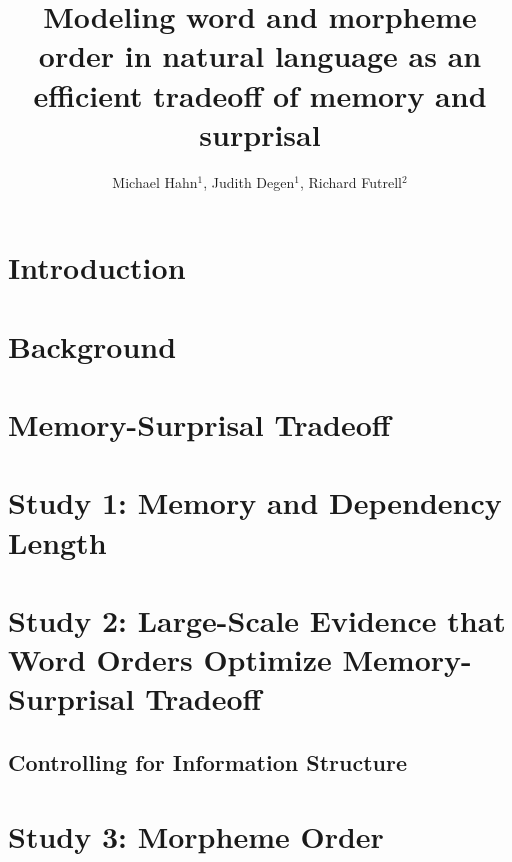 \documentclass[man]{apa7}
\title{Modeling word and morpheme order in natural language as an efficient tradeoff of memory and surprisal}
\author{Michael Hahn$^1$, Judith Degen$^1$, Richard Futrell$^2$}
\affiliation{$^1$ Stanford University, $^2$ University of California, Irvine}
\begin{document}
\maketitle


\section{Introduction}



\section{Background}\label{sec:background}





\section{Memory-Surprisal Tradeoff}\label{sec:ms-tradeoff}



\section{Study 1: Memory and Dependency Length}\label{sec:toy-study}





\section{Study 2: Large-Scale Evidence that Word Orders Optimize Memory-Surprisal Tradeoff}
\label{sec:main-experiment}



\subsection{Controlling for Information Structure}\label{subsec:freedom}



\section{Study 3: Morpheme Order}\label{sec:morphemes}
\end{document}
